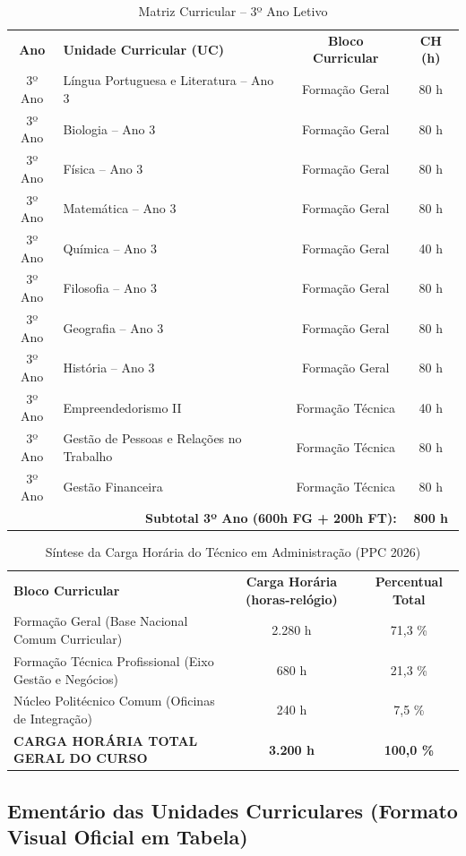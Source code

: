 \newpage

\begin{table}[H]
\centering
\small
\begin{tabularx}{\linewidth}{|c|X|c|c|}
\hline
\rowcolor{ifscgreen!20}
\multicolumn{4}{|c|}{\textbf{\large 3º ANO LETIVO (SEMESTRES 1 E 2)}} \\ \hline
\rowcolor{cinzaTabela}
\textbf{Ano} & \textbf{Unidade Curricular (UC)} & \textbf{Bloco Curricular} & \textbf{CH (h)} \\ \hline
3º Ano & Língua Portuguesa e Literatura -- Ano 3 & Formação Geral & 80 h \\ \hline
3º Ano & Biologia -- Ano 3 & Formação Geral & 80 h \\ \hline
3º Ano & Física -- Ano 3 & Formação Geral & 80 h \\ \hline
3º Ano & Matemática -- Ano 3 & Formação Geral & 80 h \\ \hline
3º Ano & Química -- Ano 3 & Formação Geral & 40 h \\ \hline
3º Ano & Filosofia -- Ano 3 & Formação Geral & 80 h \\ \hline
3º Ano & Geografia -- Ano 3 & Formação Geral & 80 h \\ \hline
3º Ano & História -- Ano 3 & Formação Geral & 80 h \\ \hline
3º Ano & Empreendedorismo II & Formação Técnica & 40 h \\ \hline
3º Ano & Gestão de Pessoas e Relações no Trabalho & Formação Técnica & 80 h \\ \hline
3º Ano & Gestão Financeira & Formação Técnica & 80 h \\ \hline
\multicolumn{3}{|r|}{\textbf{Subtotal 3º Ano (600h FG + 200h FT):}} & \textbf{800 h} \\ \hline
\end{tabularx}
\caption{Matriz Curricular -- 3º Ano Letivo}
\end{table}

\begin{table}[H]
\centering
\small
\begin{tabularx}{\linewidth}{|X|c|c|}
\hline
\rowcolor{ifscgreen!20}
\multicolumn{3}{|c|}{\textbf{\large QUADRO SÍNTESE DA CARGA HORÁRIA TOTAL DO CURSO}} \\ \hline
\rowcolor{cinzaTabela}
\textbf{Bloco Curricular} & \textbf{Carga Horária (horas-relógio)} & \textbf{Percentual Total} \\ \hline
Formação Geral (Base Nacional Comum Curricular) & 2.280 h & 71,3 \% \\ \hline
Formação Técnica Profissional (Eixo Gestão e Negócios) & 680 h & 21,3 \% \\ \hline
Núcleo Politécnico Comum (Oficinas de Integração) & 240 h & 7,5 \% \\ \hline
\hline
\rowcolor{ifscgreen!10}
\textbf{CARGA HORÁRIA TOTAL GERAL DO CURSO} & \textbf{3.200 h} & \textbf{100,0 \%} \\ \hline
\end{tabularx}
\caption{Síntese da Carga Horária do Técnico em Administração (PPC 2026)}
\end{table}

\newpage
\subsection{Ementário das Unidades Curriculares (Formato Visual Oficial em Tabela)}

